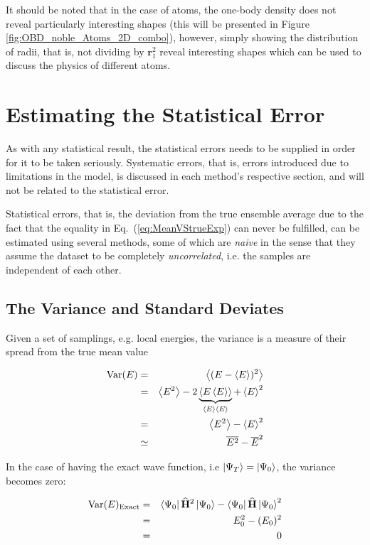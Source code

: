 It should be noted that in the case of atoms, the one-body density does not reveal particularly interesting shapes (this will be presented in Figure \ref{fig:OBD_noble_Atoms_2D_combo}), however, simply showing the distribution of radii, that is, not dividing by $\mathbf{r}_1^2$ reveal interesting shapes which can be used to discuss the physics of different atoms. 



\section{Estimating the Statistical Error}

As with any statistical result, the statistical errors needs to be supplied in order for it to be taken seriously. Systematic errors, that is, errors introduced due to limitations in the model, is discussed in each method's respective section, and will not be related to the statistical error. 

Statistical errors, that is, the  deviation from the true ensemble average due to the fact that the equality in Eq.~(\ref{eq:MeanVStrueExp}) can never be fulfilled, can be estimated using several methods, some of which are \textit{naive} in the sense that they assume the dataset to be completely \textit{uncorrelated}, i.e. the samples are independent of each other.

\subsection{The Variance and Standard Deviates}
\label{sec:varAndSTD}

Given a set of samplings, e.g. local energies, the variance is a measure of their spread from the true mean value

\begin{eqnarray}
\label{eq:variance}
\mathrm{Var}(E) &=& \left< (E-\left< E \right>)^2 \right> \nonumber\\
        &=& \left< E^2 \right> - 2\underbrace{\left< E\left< E \right> \right>}_{\left< E \right>\left< E \right>} + \left< E \right>^2 \nonumber\\
        &=& \left< E^2 \right> - \left< E \right>^2 \\
        &\simeq& \overline{E^2} - \overline{E}^2
\end{eqnarray}

In the case of having the exact wave function, i.e $\left| \Psi_T \right> = \left| \Psi_0 \right>$, the variance becomes zero:

\begin{eqnarray*}
\label{eq:varianceZeroExact}
\mathrm{Var}(E)_\mathrm{Exact} &=& \left< \Psi_0 \right|{\bf\widehat{H}}^2\left| \Psi_0 \right> -  \left< \Psi_0 \right|{\bf\widehat{H}}\left| \Psi_0 \right>^2 \\
		        &=& E_0^2 - (E_0)^2 \\
		        &=& 0
\end{eqnarray*}

